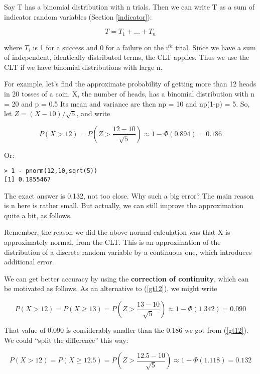 Say T has a binomial distribution with n trials.  Then we  
can write T as a sum of indicator random variables (Section
\ref{indicator}):

\begin{equation}
T = T_1+...+T_n
\end{equation}

where $T_i$ is 1 for a success and 0 for a failure on the i$^{th}$
trial.  Since we have a sum of independent, identically distributed
terms, the CLT applies.  Thus we use the CLT if we have binomial
distributions with large n.

For example, let's find the approximate probability of getting more than
12 heads in 20 tosses of a coin.  X, the number of heads, has a binomial
distribution with n = 20 and p = 0.5  Its mean and variance are then
np = 10 and np(1-p) = 5.  So, let $Z = (X-10)/\sqrt{5}$, and write

\begin{equation}
\label{gt12}
P(X > 12) = P(Z > \frac{12-10}{\sqrt{5}}) 
\approx 1 - \Phi(0.894) = 0.186
\end{equation}

Or:

\begin{Verbatim}[fontsize=\relsize{-2}]
> 1 - pnorm(12,10,sqrt(5))
[1] 0.1855467
\end{Verbatim}

The exact answer is 0.132, not too close.  Why such a big error?
The main reason is n here is rather small.  But actually, we can still
improve the approximation quite a bit, as follows.

Remember, the reason we did the above normal calculation was that X is
approximately normal, from the CLT.  This is an approximation of the
distribution of a discrete random variable by a continuous one, which
introduces additional error.

We can get better accuracy by using the {\bf correction of continuity},
which can be motivated as follows.  As an alternative to (\ref{gt12}),
we might write

\begin{equation}
P(X > 12) = P( X \geq 13) = P(Z > \frac{13-10}{\sqrt{5}}) 
\approx 1 - \Phi(1.342) = 0.090
\end{equation}

That value of 0.090 is considerably smaller than the 0.186 we got from
(\ref{gt12}).  We could ``split the difference'' this way:

\begin{equation}
P(X > 12) = P( X \geq 12.5) = P(Z > \frac{12.5-10}{\sqrt{5}}) 
\approx 1 - \Phi(1.118) = 0.132
\end{equation}

